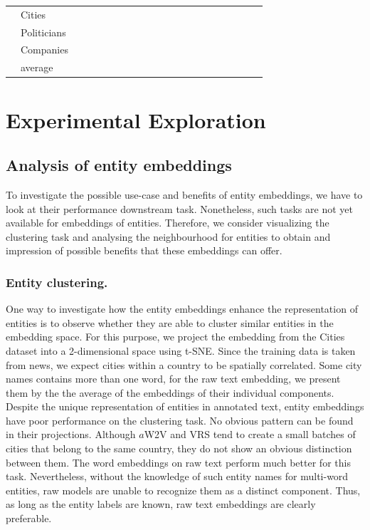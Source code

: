 \begin{table}[t]
{\begin{tabular}{llccccccccccccccccccc}
\cmidrule(lr){11-13}
\cmidrule(lr){15-17}
\cmidrule(lr){19-21}
                    & Cities &     & &  &&  &  &   & &  & &   & &  &  &  &   &  &  &   \\
\cmidrule(lr){3-5}
\cmidrule(lr){7-9}
\cmidrule(lr){11-13}
\cmidrule(lr){15-17}
\cmidrule(lr){19-21}
                    & Politicians &     & &  &&  &  &   & &  & &   & &  &  &  &   &  &  &   \\
\cmidrule(lr){3-5}
\cmidrule(lr){7-9}
\cmidrule(lr){11-13}
\cmidrule(lr){15-17}
\cmidrule(lr){19-21}
                    & Companies &     & &  &&  &  &   & &  & &   & &  &  &  &   &  &  &   \\
\cmidrule(lr){2-21}
                    & average &     & &  &&  &  &   & &  & &   & &  &  &  &   &  &  &   \\
\bottomrule
\end{tabular}%
}
\end{table}

\section{Experimental Exploration}\label{sec:eval_experimental}

\subsection{Analysis of entity embeddings}\label{subsec:exp_entity}
To investigate the possible use-case and benefits of entity embeddings, we have to look at their performance downstream task. Nonetheless, such tasks are not yet available for embeddings of entities. Therefore, we consider visualizing the clustering task and analysing the neighbourhood for entities to obtain and impression of possible benefits that these embeddings can offer. 

\subsubsection{Entity clustering.} 
One way to investigate how the entity embeddings enhance the representation of entities is to observe whether they are able to cluster similar entities in the embedding space. For this purpose, we project the embedding from the Cities dataset into a 2-dimensional space using t-SNE. Since the training data is taken from news, we expect cities within a country to be spatially correlated. Some city names contains more than one word, for the raw text embedding, we present them by the the average of the embeddings of their individual components. Despite the unique representation of entities in annotated text, entity embeddings have poor performance on the clustering task. No obvious pattern can be found in their projections. Although $a$W2V and VRS tend to create a small batches of cities that belong to the same country, they do not show an obvious distinction between them. The word embeddings on raw text perform much better for this task. Nevertheless, without the knowledge of such entity names for multi-word entities, raw models are unable to recognize them as a distinct component. Thus, as long as the entity labels are known, raw text embeddings are clearly preferable. 

